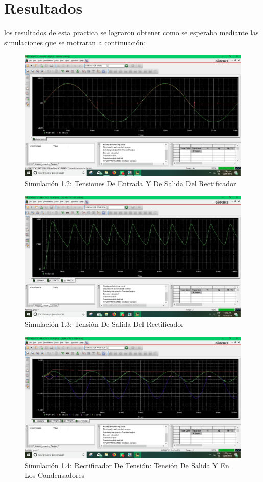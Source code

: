 \documentclass[10pt,a4paper]{article}
\begin{document}
\newpage
\section{Resultados}
los resultados de esta practica se lograron obtener como se esperaba mediante las simulaciones que se motraran a continuación:
\begin{figure}[hbtp]
\centering
\includegraphics[scale=0.3]{2.jpeg}
\caption{ Simulación 1.2: Tensiones De Entrada Y De Salida Del Rectificador}
\end{figure}
\begin{figure}[hbtp]
\centering
\includegraphics[scale=0.3]{3.jpeg}
\caption{Simulación 1.3: Tensión De Salida Del Rectificador}
\end{figure}
\begin{figure}[hbtp]
\centering
\includegraphics[scale=0.3]{4.jpeg}
\caption{Simulación 1.4: Rectificador De Tensión: Tensión De Salida Y En Los Condensadores}
\end{figure}
\end{document}
